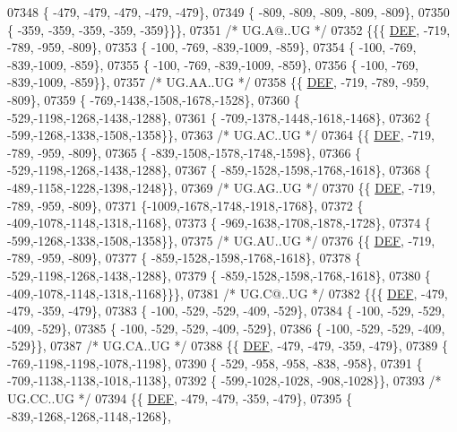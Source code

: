 \begin{DoxyCode}
07348 \{ -479, -479, -479, -479, -479\},
07349 \{ -809, -809, -809, -809, -809\},
07350 \{ -359, -359, -359, -359, -359\}\}\},
07351 \textcolor{comment}{/* UG.A@..UG */}
07352 \{\{\{  \mbox{\hyperlink{1_88_84__epars_8h_a397419fc12b37ed479c8abb9d444d843}{DEF}}, -719, -789, -959, -809\},
07353 \{ -100, -769, -839,-1009, -859\},
07354 \{ -100, -769, -839,-1009, -859\},
07355 \{ -100, -769, -839,-1009, -859\},
07356 \{ -100, -769, -839,-1009, -859\}\},
07357 \textcolor{comment}{/* UG.AA..UG */}
07358 \{\{  \mbox{\hyperlink{1_88_84__epars_8h_a397419fc12b37ed479c8abb9d444d843}{DEF}}, -719, -789, -959, -809\},
07359 \{ -769,-1438,-1508,-1678,-1528\},
07360 \{ -529,-1198,-1268,-1438,-1288\},
07361 \{ -709,-1378,-1448,-1618,-1468\},
07362 \{ -599,-1268,-1338,-1508,-1358\}\},
07363 \textcolor{comment}{/* UG.AC..UG */}
07364 \{\{  \mbox{\hyperlink{1_88_84__epars_8h_a397419fc12b37ed479c8abb9d444d843}{DEF}}, -719, -789, -959, -809\},
07365 \{ -839,-1508,-1578,-1748,-1598\},
07366 \{ -529,-1198,-1268,-1438,-1288\},
07367 \{ -859,-1528,-1598,-1768,-1618\},
07368 \{ -489,-1158,-1228,-1398,-1248\}\},
07369 \textcolor{comment}{/* UG.AG..UG */}
07370 \{\{  \mbox{\hyperlink{1_88_84__epars_8h_a397419fc12b37ed479c8abb9d444d843}{DEF}}, -719, -789, -959, -809\},
07371 \{-1009,-1678,-1748,-1918,-1768\},
07372 \{ -409,-1078,-1148,-1318,-1168\},
07373 \{ -969,-1638,-1708,-1878,-1728\},
07374 \{ -599,-1268,-1338,-1508,-1358\}\},
07375 \textcolor{comment}{/* UG.AU..UG */}
07376 \{\{  \mbox{\hyperlink{1_88_84__epars_8h_a397419fc12b37ed479c8abb9d444d843}{DEF}}, -719, -789, -959, -809\},
07377 \{ -859,-1528,-1598,-1768,-1618\},
07378 \{ -529,-1198,-1268,-1438,-1288\},
07379 \{ -859,-1528,-1598,-1768,-1618\},
07380 \{ -409,-1078,-1148,-1318,-1168\}\}\},
07381 \textcolor{comment}{/* UG.C@..UG */}
07382 \{\{\{  \mbox{\hyperlink{1_88_84__epars_8h_a397419fc12b37ed479c8abb9d444d843}{DEF}}, -479, -479, -359, -479\},
07383 \{ -100, -529, -529, -409, -529\},
07384 \{ -100, -529, -529, -409, -529\},
07385 \{ -100, -529, -529, -409, -529\},
07386 \{ -100, -529, -529, -409, -529\}\},
07387 \textcolor{comment}{/* UG.CA..UG */}
07388 \{\{  \mbox{\hyperlink{1_88_84__epars_8h_a397419fc12b37ed479c8abb9d444d843}{DEF}}, -479, -479, -359, -479\},
07389 \{ -769,-1198,-1198,-1078,-1198\},
07390 \{ -529, -958, -958, -838, -958\},
07391 \{ -709,-1138,-1138,-1018,-1138\},
07392 \{ -599,-1028,-1028, -908,-1028\}\},
07393 \textcolor{comment}{/* UG.CC..UG */}
07394 \{\{  \mbox{\hyperlink{1_88_84__epars_8h_a397419fc12b37ed479c8abb9d444d843}{DEF}}, -479, -479, -359, -479\},
07395 \{ -839,-1268,-1268,-1148,-1268\},

\end{DoxyCode}
